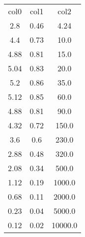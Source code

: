 \begin{table}
\begin{tabular}{ccc}
col0 & col1 & col2 \\
2.8 & 0.46 & 4.24 \\
4.4 & 0.73 & 10.0 \\
4.88 & 0.81 & 15.0 \\
5.04 & 0.83 & 20.0 \\
5.2 & 0.86 & 35.0 \\
5.12 & 0.85 & 60.0 \\
4.88 & 0.81 & 90.0 \\
4.32 & 0.72 & 150.0 \\
3.6 & 0.6 & 230.0 \\
2.88 & 0.48 & 320.0 \\
2.08 & 0.34 & 500.0 \\
1.12 & 0.19 & 1000.0 \\
0.68 & 0.11 & 2000.0 \\
0.23 & 0.04 & 5000.0 \\
0.12 & 0.02 & 10000.0 \\
\end{tabular}
\end{table}
